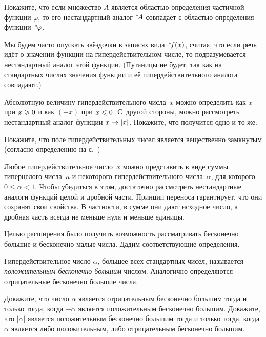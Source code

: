 \begin{problem}
Покажите, что если множество $A$ является областью определения
частичной функции $\varphi$, то его нестандартный аналог
${}^*\!A$ совпадает с областью определения
функции~${}^*\!\varphi$.
\end{problem}

Мы будем часто опускать звёздочки в записях вида~${}^*\!f(x)$,
считая, что если речь идёт о значении функции
на гипердействительном числе, то подразумевается нестандартный
аналог этой функции. (Путаницы не будет, так как на стандартных
числах значения функции и её гипердействительного аналога
совпадают.)

\begin{problem}
Абсолютную величину%
гипердействительного числа~$x$ можно определить
как $x$ при $x\hm\ge0$  и как $(-x)$ при $x\hm\le 0$. С~другой
стороны, можно рассмотреть нестандартный аналог
функции $x\hm\mapsto |x|$. Покажите, что получится одно и то же.
\end{problem}

\begin{problem}
Покажите, что поле гипердействительных чисел является
вещественно замкнутым%
%
(согласно определению на
с.~\pageref{real-closed-fields})
\end{problem}

Любое гипердействительное число~$x$ можно представить в виде
суммы гиперцелого числа~$n$ и некоторого гипердействительного
числа~$\alpha$, для которого $0\le\alpha<1$. Чтобы
убедиться в этом, достаточно рассмотреть нестандартные аналоги
функций целой и дробной части. Принцип переноса гарантирует, что
они сохранят свои свойства. В частности, в сумме они дают
исходное число, а дробная часть всегда не меньше нуля и меньше
единицы.

Целью расширения было получить возможность рассматривать
бесконечно большие и бесконечно малые числа. Дадим
соответствующие определения.

Гипердействительное число $\alpha$, большее всех стандартных
чисел, называется \emph{положительным бесконечно большим} числом.%
%
Аналогично определяются отрицательные бесконечно большие числа.

\begin{problem}
Докажите, что
число $\alpha$ является отрицательным бесконечно большим
тогда и только тогда, когда $-\alpha$ является положительным
бесконечно большим.
Докажите, что  $|\alpha|$ является положительным бесконечно
большим тогда и только тогда, когда $\alpha$ является либо
положительным, либо отрицательным бесконечно большим.
\end{problem}

